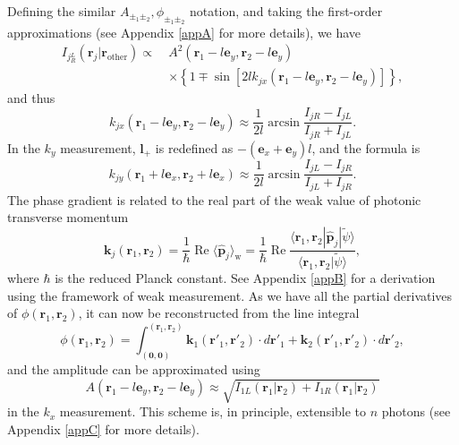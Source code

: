 \documentclass[pra,english,reprint,nofootinbib,aps,superscriptaddress,showpacs,showkeys]{revtex4-2}
\theoremstyle{definition}
\theoremstyle{remark}
\begin{document}
	Defining the similar $A_{\pm_1\pm_2},\phi_{\pm_1\pm_2}$ notation, and taking the first-order approximations (see Appendix \ref{appA} for more details), we have
	\begin{align}\label{condintres}
		I_{j{^L_R}}(\mathbf{r}_j|\mathbf{r}_\textrm{other})\propto~ &A^2(\mathbf{r}_1-l\mathbf{e}_y,\mathbf{r}_2-l\mathbf{e}_y)\nonumber\\
		&\times\left\{1\mp\sin[2lk_{jx}(\mathbf{r}_1-l\mathbf{e}_y,\mathbf{r}_2-l\mathbf{e}_y)]\right\},
	\end{align}
	and thus
	\begin{equation}
		k_{jx}(\mathbf{r}_1-l\mathbf{e}_y,\mathbf{r}_2-l\mathbf{e}_y)\approx\frac{1}{2l}\arcsin\frac{I_{jR}-I_{jL}}{I_{jR}+I_{jL}}.
	\end{equation}
	In the $k_y$ measurement, $\mathbf{l}_+$ is redefined as $-(\mathbf{e}_x+\mathbf{e}_y)l$, and the formula is
	\begin{equation}
		k_{jy}(\mathbf{r}_1+l\mathbf{e}_x,\mathbf{r}_2+l\mathbf{e}_x)\approx\frac{1}{2l}\arcsin\frac{I_{jL}-I_{jR}}{I_{jL}+I_{jR}}.
	\end{equation}
	The phase gradient is related to the real part of the weak value of photonic transverse momentum
	\begin{equation}\label{weakvalueeqn}
		\mathbf{k}_j(\mathbf{r}_1,\mathbf{r}_2)=\frac{1}{\hbar}\operatorname{Re}\langle\hat{\mathbf{p}}_j\rangle_\textrm{w}=\frac{1}{\hbar}\operatorname{Re}\frac{\langle\mathbf{r}_1,\mathbf{r}_2|\hat{\mathbf{p}}_j|\tilde{\psi}\rangle}{\langle\mathbf{r}_1,\mathbf{r}_2|\tilde{\psi}\rangle},
	\end{equation} 
	where $\hbar$ is the reduced Planck constant. See Appendix \ref{appB} for a derivation using the framework of weak measurement. As we have all the partial derivatives of $\phi(\mathbf{r}_1,\mathbf{r}_2)$, it can now be reconstructed from the line integral \cite{SHWSrecon}
	\begin{equation}\label{lineint}
		\phi(\mathbf{r}_1,\mathbf{r}_2)=\int_{(\mathbf{0},\mathbf{0})}^{(\mathbf{r}_1,\mathbf{r}_2)}\mathbf{k}_1(\mathbf{r}'_1,\mathbf{r}'_2)\cdot d\mathbf{r}'_1+\mathbf{k}_2(\mathbf{r}'_1,\mathbf{r}'_2)\cdot d\mathbf{r}'_2,
	\end{equation}
	and the amplitude can be approximated using
	\begin{equation}
		A(\mathbf{r}_1-l\mathbf{e}_y,\mathbf{r}_2-l\mathbf{e}_y)\approx \sqrt{I_{1L}(\mathbf{r}_1|\mathbf{r}_2)+I_{1R}(\mathbf{r}_1|\mathbf{r}_2)}
	\end{equation}
	in the $k_x$ measurement. This scheme is, in principle, extensible to $n$ photons \cite{nphoton} (see Appendix \ref{appC} for more details).
	
\end{document}

